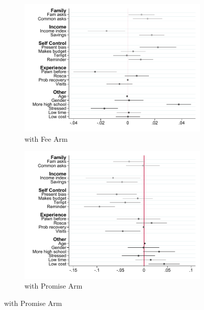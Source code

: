 \begin{figure}[H]
    \caption{Predictors of commitment contract take-up}
    \label{interactions_takeup}
    \begin{center}
    \begin{subfigure}{0.45\textwidth}
        \caption{with Fee Arm}
        \centering
        \includegraphics[width=\textwidth]{Figuras/pago_frec_vol_fee_interactions_rf.pdf}
    \end{subfigure}
    \begin{subfigure}{0.45\textwidth}
        \caption{with Promise Arm}
        \centering
        \includegraphics[width=\textwidth]{Figuras/pago_frec_vol_promise_interactions_rf.pdf}
    \end{subfigure}
    \end{center}
     \scriptsize
\end{figure}


